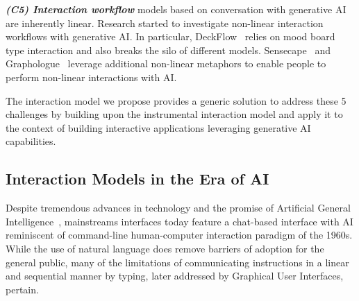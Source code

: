 \vspace{5pt}\textit{\textbf{(C5) Interaction workflow}} models based on conversation with generative AI are inherently linear.  Research started to investigate non-linear interaction workflows with generative AI. In particular, DeckFlow~\cite{croisdale_deckflow_2023} relies on mood board type interaction and also breaks the silo of different models. Sensecape~\cite{suh_sensecape_2023} and Graphologue~\cite{jiang_graphologue_2023} leverage additional non-linear metaphors to enable people to perform non-linear interactions with AI.

The interaction model we propose provides a generic solution to address these 5 challenges by building upon the instrumental interaction model and apply it to the context of building interactive applications leveraging generative AI capabilities. 


\subsection{Interaction Models in the Era of AI}

Despite tremendous advances in technology and the promise of Artificial General Intelligence~\cite{bubeck2023sparks}, mainstreams interfaces today feature a chat-based interface with AI reminiscent of command-line human-computer interaction paradigm of the 1960s. While the use of natural language does remove barriers of adoption for the general public, many of the limitations of communicating instructions in a linear and sequential manner by typing, later addressed by Graphical User Interfaces, pertain. 


